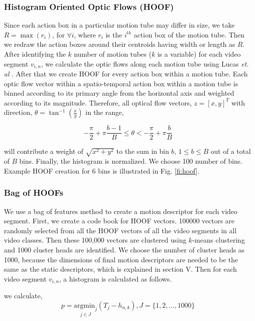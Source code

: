 \subsubsection{Histogram Oriented Optic Flows (HOOF)}
Since each action box in a particular motion tube may differ in size, we take $R = \max(r_{i})$, for $\forall{i}$,
where $r_{i}$ is the $i^{th}$ action box of the motion tube. Then we redraw the action boxes around their centroids having width or length as $R$.
After identifying the $k$ number of motion tubes ($k$ is a variable) for each video segment $v_{i,n}$, we calculate the optic flows along each motion tube
using Lucas \textit{et. al} \cite{lucas1981iterative}.
After that we create HOOF\cite{chaudhry2009histograms} for every
    action box within a motion tube. Each optic flow vector within a spatio-temporal action box within a motion tube is binned according
    to its primary angle from the horizontal axis and weighted according to its magnitude.  Therefore, all optical flow vectors, $z=[x,y]^T$ with direction,   
$\theta = \tan^{-1}(\frac{x}{y})$ in the range,

\begin{equation}
- \frac{\pi}{2} + \pi\frac{b-1}{B} \leq \theta < -\frac{\pi}{2} + \pi\frac{b}{B}
\end{equation}

will contribute a weight of $\sqrt{x^2 + y^2}$ to the sum in bin $b$, $1 \leq b \leq B$ out of a total of
$B$ bins. Finally, the histogram is normalized. We choose 100 number of bins. Example HOOF creation for 6 bins is illustrated in Fig. \ref{fi:hoof}.

\subsubsection{Bag of HOOFs}
We use a bag of features method to create a motion descriptor for each video segment. First, we create a code book for HOOF vectors.
100000 vectors are randomly selected from all the HOOF vectors of all the video segments in all video classes.
Then these 100,000 vectors are clustered using $k$-means clustering and 1000 cluster heads
are identified. We choose the number of cluster heads as 1000, because the dimensions of final motion descriptors are needed to be the same as
the static descriptors, which is explained in section V. Then for each video segment $v_{i,n}$, a histogram is calculated as follows.


we calculate,
\begin{equation}
p = \underset{j\in J}{\mathrm{argmin}_{j}}(T_{j}-h_{n,k}), J=\{1,2,\dots,1000\}
\end{equation}

